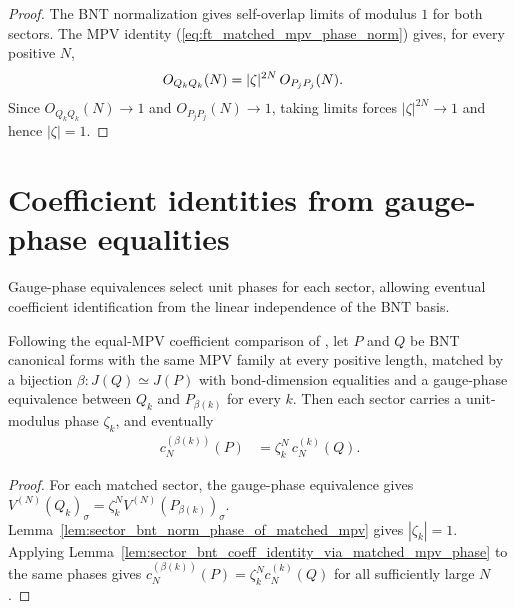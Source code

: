 \begin{proof}\leanok
    The BNT normalization gives self-overlap limits of modulus $1$ for both
    sectors. The MPV identity (\ref{eq:ft_matched_mpv_phase_norm}) gives, for
    every positive $N$,
    \begin{align}
        O_{Q_kQ_k}(N)
         & = |\zeta|^{2N}\,O_{P_jP_j}(N).
        \notag
    \end{align}
    Since $O_{Q_kQ_k}(N)\to1$ and $O_{P_jP_j}(N)\to1$, taking limits forces
    $|\zeta|^{2N}\to1$ and hence $|\zeta|=1$.
\end{proof}


\section{Coefficient identities from gauge-phase equalities}
\label{sec:app_ft_coefficient_identities}

Gauge-phase equivalences select unit phases for each sector, allowing eventual
coefficient identification from the linear independence of the BNT basis.

\begin{lemma}%
    \label{lem:sector_bnt_coeff_identity_via_global_gauge}
    \leanok
    Following the equal-MPV coefficient comparison of
    \cite[Appendix MPV proof, lines~1187--1188]{Cirac2016MPDO_arXiv}, let $P$
    and $Q$ be BNT canonical forms with the same MPV family at every positive
    length, matched by a bijection $\beta:J(Q)\simeq J(P)$ with bond-dimension
    equalities and a gauge-phase equivalence between $Q_k$ and $P_{\beta(k)}$
    for every $k$. Then each sector carries a unit-modulus phase $\zeta_k$, and
    eventually
    \begin{align}
        c_N^{(\beta(k))}(P)
         & = \zeta_k^N\,c_N^{(k)}(Q).
        \label{eq:ft_coeff_identity}
    \end{align}
\end{lemma}

\begin{proof}\leanok
    For each matched sector, the gauge-phase equivalence gives
    $V^{(N)}(Q_k)_\sigma=\zeta_k^NV^{(N)}(P_{\beta(k)})_\sigma$.
    Lemma~\ref{lem:sector_bnt_norm_phase_of_matched_mpv} gives
    $|\zeta_k|=1$. Applying
    Lemma~\ref{lem:sector_bnt_coeff_identity_via_matched_mpv_phase} to the
    same phases gives
    $c_N^{(\beta(k))}(P)=\zeta_k^Nc_N^{(k)}(Q)$ for all sufficiently
    large $N$.
\end{proof}


